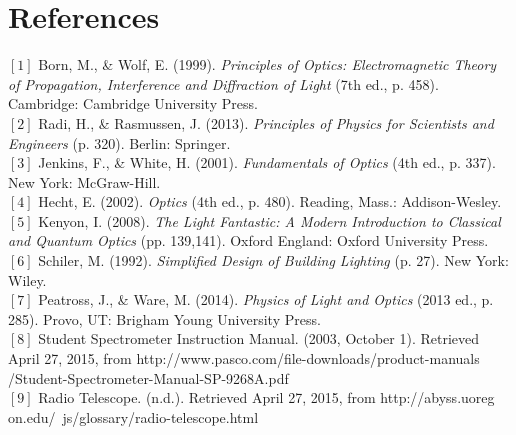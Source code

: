 \documentclass[a4paper,12pt]{report}
\begin{document}
\chapter{References}
$[1]$ Born, M., \& Wolf, E. (1999). \textit{Principles of Optics: Electromagnetic Theory of Propagation, Interference and Diffraction of Light} (7th ed., p. 458). Cambridge: Cambridge University Press.\\
$[2]$ Radi, H., \& Rasmussen, J. (2013). \textit{Principles of Physics for Scientists and Engineers} (p. 320). Berlin: Springer.\\
$[3]$ Jenkins, F., \& White, H. (2001). \textit{Fundamentals of Optics} (4th ed., p. 337). New York: McGraw-Hill.\\
$[4]$ Hecht, E. (2002). \textit{Optics} (4th ed., p. 480). Reading, Mass.: Addison-Wesley.\\
$[5]$ Kenyon, I. (2008). \textit{The Light Fantastic: A Modern Introduction to Classical and Quantum Optics} (pp. 139,141). Oxford England: Oxford University Press.\\
$[6]$ Schiler, M. (1992). \textit{Simplified Design of Building Lighting} (p. 27). New York: Wiley.\\
$[7]$  Peatross, J., \& Ware, M. (2014). \textit{Physics of Light and Optics} (2013 ed., p. 285). Provo, UT: Brigham Young University Press.\\
$[8]$ Student Spectrometer Instruction Manual. (2003, October 1). Retrieved April 27, 2015, from http://www.pasco.com/file-downloads/product-manuals\\/Student-Spectrometer-Manual-SP-9268A.pdf\\
$[9]$ Radio Telescope. (n.d.). Retrieved April 27, 2015, from http://abyss.uoreg\\on.edu/~js/glossary/radio-telescope.html
\end{document}
